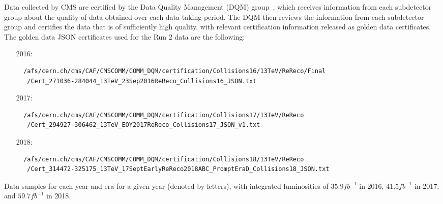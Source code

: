 Data collected by CMS are certified by the Data Quality Management (DQM) group~\cite{CMSData}, which receives information from each subdetector group about the quality of data obtained over each data-taking period.
The DQM then reviews the information from each subdetector group and certifies the data that is of sufficiently high quality, with relevant certification information released as golden data certificates.
The golden data JSON certificates used for the Run 2 data are the following: %
\begin{itemize}
  \item[2016:]
  \begingroup
  \fontsize{9pt}{12pt}
  \begin{verbatim}
  /afs/cern.ch/cms/CAF/CMSCOMM/COMM_DQM/certification/Collisions16/13TeV/ReReco/Final
   /Cert_271036-284044_13TeV_23Sep2016ReReco_Collisions16_JSON.txt
  \end{verbatim}
  \endgroup
  \item[2017:]
  \begingroup
  \fontsize{9pt}{12pt}
  \begin{verbatim}
  /afs/cern.ch/cms/CAF/CMSCOMM/COMM_DQM/certification/Collisions17/13TeV/ReReco
   /Cert_294927-306462_13TeV_EOY2017ReReco_Collisions17_JSON_v1.txt
  \end{verbatim}
  \endgroup
  \item[2018:]
  \begingroup
  \fontsize{9pt}{12pt}
  \begin{verbatim}
  /afs/cern.ch/cms/CAF/CMSCOMM/COMM_DQM/certification/Collisions18/13TeV/ReReco
   /Cert_314472-325175_13TeV_17SeptEarlyReReco2018ABC_PromptEraD_Collisions18_JSON.txt
  \end{verbatim}
  \endgroup
\end{itemize}

\begin{table}[htbp]
  \centering
  
  \caption{
    Data samples for each year and era for a given year (denoted by letters), with integrated luminosities of $35.9\unit{fb^{-1}}$ in 2016, $41.5\unit{fb^{-1}}$ in 2017, and $59.7\unit{fb^{-1}}$ in 2018.
  }
  \label{tab:dataSamples}
\end{table}

%  

%  
%
%  

